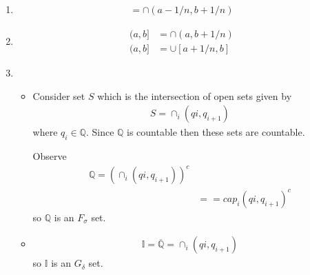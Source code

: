 \begin{enumerate}[label=(\alph*)]
    \item 
    \begin{align*}
        [a,b] = \cap (a-1/n, b+1/n)
    \end{align*}

    \item
    \begin{align*}
        (a,b] &= \cap (a, b+1/n) \\
        (a,b] &= \cup [a+1/n, b] 
    \end{align*}

    \item
    \begin{itemize}
        \item 
        Consider set $S$ which is the intersection of open sets given by
        \begin{align*}
            S = \cap_i (qi, q_{i+1})
        \end{align*}
        where $q_i \in \mathbb{Q}$. Since $\mathbb{Q}$ is countable then these sets are countable.
        
        Observe
        \begin{align*}
            \mathbb{Q} = (\cap_i (qi, q_{i+1}))^c \\
            &= =cap_i (qi, q_{i+1})^c
        \end{align*}
        so $\mathbb{Q}$ is an $F_\sigma$ set.

        \item
        \begin{align*}
            \mathbb{I} = \overline{\mathbb{Q}} = \cap_i (qi, q_{i+1})
        \end{align*}
        so $\mathbb{I}$ is an $G_\delta$ set.
    \end{itemize}
\end{enumerate}


